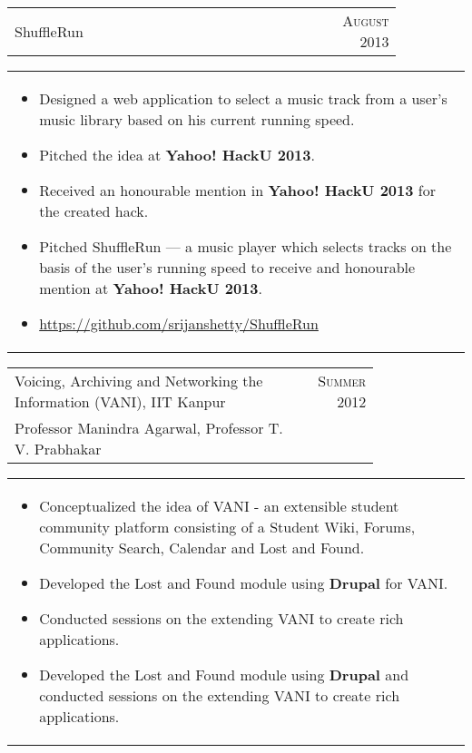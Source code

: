 \documentclass[a4paper,10pt]{article} %
\newcommand{\lproject}[4]{
    \begin{tabular}{p{0.80\linewidth}r}
        \textcolor{NavyBlue}{#2} & \multicolumn{1}{m{4cm}}{\raggedleft \textsc{#1}}\\
        #3
    \end{tabular}
    \begin{tabular}{p{\linewidth}}
    \vspace{-0.3cm}
        \footnotesize{#4}
    \end{tabular}
    \vspace{-0.5cm}
}
\newcommand{\iproject}[3]{
    \begin{tabular}{p{0.85\linewidth}r}
        \textcolor{NavyBlue}{#2} & \multicolumn{1}{m{3cm}}{\raggedleft \textsc{#1}}\\
    \end{tabular}
    \begin{tabular}{p{\linewidth}}
    \vspace{-0.3cm}
        \footnotesize{#3}
    \end{tabular}
    \vspace{-0.5cm}
}
\begin{document}
\iproject {August 2013}
          {ShuffleRun}
          {
              \begin{itemize}[leftmargin=0.5cm]
                  \item Designed a web application to select a music track from a user's music library based on his current running speed.
                  \item Pitched the idea at \textbf{Yahoo! HackU 2013}.
                  \item Received an honourable mention in \textbf{Yahoo!  HackU 2013} for the created hack.
                  \item Pitched ShuffleRun --- a music player which selects tracks on the basis of the user's running speed to receive
                      and honourable mention at \textbf{Yahoo! HackU 2013}.
                  \item \href{https://github.com/srijanshetty/ShuffleRun} {https://github.com/srijanshetty/ShuffleRun}
              \end{itemize}
          }

\lproject {Summer 2012}
          {Voicing, Archiving and Networking the Information \textsc{(VANI)}, IIT Kanpur}
          {Professor Manindra Agarwal, Professor T. V. Prabhakar}
          {
              \begin{itemize}[leftmargin=0.5cm]
                  \item Conceptualized the idea of VANI - an extensible student community platform consisting
                      of a Student Wiki, Forums, Community Search, Calendar and Lost and Found.
                  \item Developed the Lost and Found module using \textbf{Drupal} for VANI.
                  \item Conducted sessions on the extending VANI to create rich applications.
                  \item Developed the Lost and Found module using \textbf{Drupal}
                      and conducted sessions on the extending VANI to create rich applications.
              \end{itemize}
          }
\end{document}
